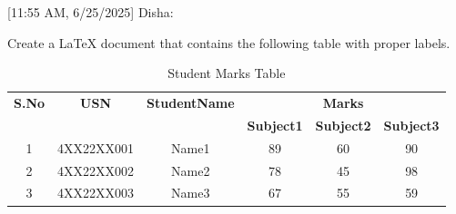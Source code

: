 [11:55 AM, 6/25/2025] Disha: \documentclass{article}
\begin{document}
Create a LaTeX document that contains the following table with proper labels.

\begin{table}[h!]
\centering
\begin{tabular}{|c|c|c|c|c|c|}
\hline
\textbf{S.No} & \textbf{USN} & \textbf{StudentName} & \multicolumn{3}{c|}{\textbf{Marks}} \\
\cline{4-6}
 & & & \textbf{Subject1} & \textbf{Subject2} & \textbf{Subject3} \\
\hline
1 & 4XX22XX001 & Name1 & 89 & 60 & 90 \\
\hline
2 & 4XX22XX002 & Name2 & 78 & 45 & 98 \\
\hline
3 & 4XX22XX003 & Name3 & 67 & 55 & 59 \\
\hline
\end{tabular}
\caption{Student Marks Table}
\label{tab:studentmarks}
\end{table}
\end{document}
